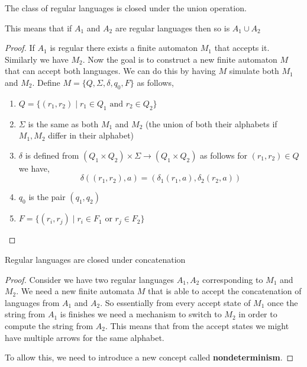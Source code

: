 \begin{theorem}
    The class of regular languages is closed under the union operation.
\end{theorem}
\begin{note}
    This means that if $A_{1}$ and $A_{2}$ are regular languages then so is $A_{1} \cup A_{2}$
\end{note}
\begin{proof}
    If $A_{1}$ is regular there exists a finite automaton $M_{1}$ that accepts it. Similarly we have $M_{2}$. Now the goal is to construct a new finite automaton $M$ that can accept both languages. We can do this by having $M$ simulate both $M_{1}$ and $M_{2}$. Define $M = \{Q, \Sigma, \delta, q_{0}, F\}$ as follows, 
    \begin{enumerate}
        \item $Q = \{(r_{1}, r_{2}) \mid r_{1} \in Q_{1} \text{ and } r_{2} \in Q_{2}\}$
        \item $\Sigma$ is the same as both $M_{1}$ and $M_{2}$ (the union of both their alphabets if $M_{1}, M_{2}$ differ in their alphabet)
        \item $\delta$ is defined from $(Q_{1} \times Q_{2}) \times \Sigma \to (Q_{1} \times Q_{2})$ as follows for $(r_{1}, r_{2}) \in Q$ we have,
        \[
            \delta((r_{1}, r_{2}), a) = (\delta_{1}(r_{1}, a), \delta_2(r_{2}, a))
        \]

    \item $q_{0}$ is the pair $(q_{1}, q_{2})$
    \item $F = \{(r_i, r_j) \mid r_i \in F_{1} \text{ or } r_{j} \in F_{2}\}$
    \end{enumerate}
\end{proof}

\begin{theorem}
    Regular languages are closed under concatenation
\end{theorem}
\begin{proof}
    Consider we have two regular languages $A_{1}, A_{2}$ corresponding to $M_{1}$ and $M_{2}$. We need a new finite automata $M$ that is able to accept the concatenation of languages from $A_{1}$ and $A_{2}$. So essentially from every accept state of $M_{1}$ once the string from $A_{1}$ is finishes we need a mechanism to switch to $M_{2}$ in order to compute the string from $A_{2}$. This means that from the accept states we might have multiple arrows for the same alphabet. 

    \vspace{1em}
    
    To allow this, we need to introduce a new concept called \textbf{nondeterminism}.
\end{proof}

